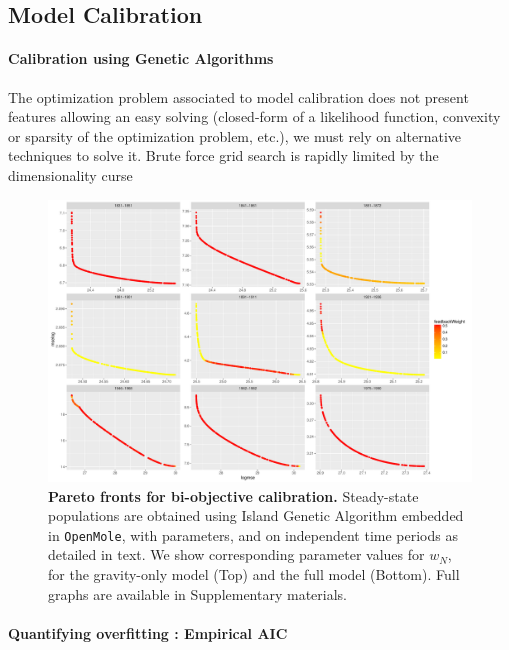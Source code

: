 \documentclass[Royal,sageh,times]{sagej}
\begin{document}
\subsection{Model Calibration}



\paragraph{Calibration using Genetic Algorithms}


The optimization problem associated to model calibration does not present features allowing an easy solving (closed-form of a likelihood function, convexity or sparsity of the optimization problem, etc.), we must rely on alternative techniques to solve it. Brute force grid search is rapidly limited by the dimensionality curse


\begin{figure}
\centering
\includegraphics[width=\textwidth]{figures/allperiods_feedbackWeight}
\caption{\textbf{Pareto fronts for bi-objective calibration.} Steady-state populations are obtained using Island Genetic Algorithm embedded in \texttt{OpenMole}, with parameters, and on independent time periods as detailed in text. We show  corresponding parameter values for $w_N$, for the gravity-only model (Top) and the full model (Bottom). Full graphs are available in Supplementary materials.}
\end{figure}



\paragraph{Quantifying overfitting : Empirical AIC}
\end{document}
